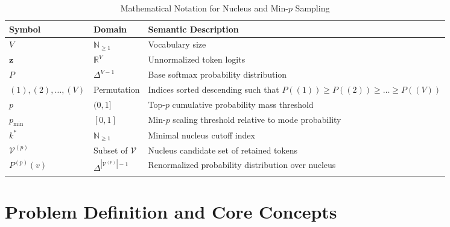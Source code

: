 \documentclass[11pt,a4paper]{article}
\theoremstyle{definition}
\begin{document}
\begin{table}[h]
\centering
\caption{Mathematical Notation for Nucleus and Min-$p$ Sampling}
\begin{tabular}{lll}
\toprule
\textbf{Symbol} & \textbf{Domain} & \textbf{Semantic Description} \\
\midrule
$V$ & $\mathbb{N}_{\ge 1}$ & Vocabulary size \\
$\mathbf{z}$ & $\mathbb{R}^V$ & Unnormalized token logits \\
$P$ & $\Delta^{V-1}$ & Base softmax probability distribution \\
$(1), (2), \dots, (V)$ & Permutation & Indices sorted descending such that $P((1)) \ge P((2)) \ge \dots \ge P((V))$ \\
$p$ & $(0, 1]$ & Top-$p$ cumulative probability mass threshold \\
$p_{\min}$ & $[0, 1]$ & Min-$p$ scaling threshold relative to mode probability \\
$k^*$ & $\mathbb{N}_{\ge 1}$ & Minimal nucleus cutoff index \\
$\mathcal{V}^{(p)}$ & Subset of $\mathcal{V}$ & Nucleus candidate set of retained tokens \\
$P^{(p)}(v)$ & $\Delta^{|\mathcal{V}^{(p)}|-1}$ & Renormalized probability distribution over nucleus \\
\bottomrule
\end{tabular}
\end{table}

\section{Problem Definition and Core Concepts}
\end{document}
